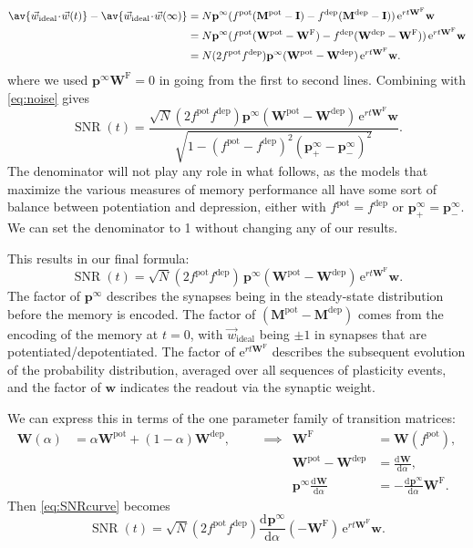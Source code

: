 \documentclass[9pt,twocolumn,twoside,lineno]{pnas-new}
\newcommand{\cdt}{\!\cdot\!}
\newcommand{\diff}[3][]{\frac{\mathrm{d}^{#1} #2}{\mathrm{d}{#3}^{#1}}}
\newcommand{\e}{\mathrm{e}}
\DeclareMathOperator{\SNR}{SNR}
\newcommand{\wv}{\vec{w}}
\newcommand{\wvi}{\vec{w}_\text{ideal}}
\newcommand{\I}{\mathbf{I}}
\newcommand{\prob}{\mathbf{p}}
\newcommand{\eq}{\prob^\infty}
\newcommand{\w}{\mathbf{w}}
\newcommand{\W}{\mathbf{W}}
\newcommand{\M}{\mathbf{M}}
\newcommand{\frg}{\W^{\mathrm{F}}}
\newcommand{\pot}{^{\text{pot}}}
\newcommand{\dep}{^{\text{dep}}}
\begin{document}
\begin{strip}
%
\begin{equation}\label{eq:signal}
\begin{aligned}
  \av{\wv_\text{ideal}\cdt\wv(t)} - \av{\wv_\text{ideal}\cdt\wv(\infty)}
    &= N \eq (f\pot(\M\pot-\I)-f\dep(\M\dep-\I))\, \e^{rt\frg} \w \\
    &= N \eq (f\pot(\W\pot-\frg)-f\dep(\W\dep-\frg))\, \e^{rt\frg} \w \\
    &= N (2f\pot f\dep)\eq (\W\pot  - \W\dep )\,\e^{rt\frg}\w.
\end{aligned}
\end{equation}
%
where we used $\eq\frg=0$ in going from the first to second lines.
Combining with \cref{eq:noise} gives
%
\begin{equation}\label{eq:SNRcurveExact}
  \SNR(t) = \frac{\sqrt{N} (2f\pot f\dep ) \eq (\W\pot  - \W\dep )\,\e^{rt\frg}\w}
                 {\sqrt{1-(f\pot-f\dep)^2(\eq_+-\eq_-)^2}}.
\end{equation}
%
The denominator will not play any role in what follows, as the models that maximize the various measures of memory performance all have some sort of balance between potentiation and depression, either with $f\pot=f\dep$ or $\eq_+=\eq_-$.
We can set the denominator to 1 without changing any of our results.

This results in our final formula:
%
\begin{equation}\label{eq:SNRcurve}
  \SNR(t) = \sqrt{N} (2f\pot f\dep )\, \eq (\W\pot  - \W\dep )\,\e^{rt\frg}\w.
\end{equation}
%
The factor of $\eq$ describes the synapses being in the steady-state distribution before the memory is encoded. The factor of $(\M\pot-\M\dep)$ comes from the encoding of the memory at $t=0$, with $\wvi$ being $\pm1$ in synapses that are potentiated/depotentiated. The factor of $\e^{rt\frg}$ describes the subsequent evolution of the probability distribution, averaged over all sequences of plasticity events, and the factor of $\w$ indicates the readout via the synaptic weight.

We can express this in terms of the one parameter family of transition matrices:
%
\begin{equation}\label{eq:Walpha}
  \begin{aligned}
  \W(\alpha) &= \alpha\W\pot +(1-\alpha)\W\dep ,
  &\quad&\implies&
    \frg&=\W(f\pot ),\\&&&&
    \W\pot  - \W\dep  &= \diff{\W}{\alpha},\\&&&&
    \eq \diff{\W}{\alpha} &= -\diff{\eq}{\alpha} \frg.
  \end{aligned}
\end{equation}
%
Then \cref{eq:SNRcurve} becomes
%
\begin{equation}\label{eq:SNRalpha}
  \SNR(t) = \sqrt{N} (2f\pot f\dep ) \diff{\eq}{\alpha}(-\frg)\,\e^{rt\frg}\w.
\end{equation}
%





\end{strip}
\end{document}
